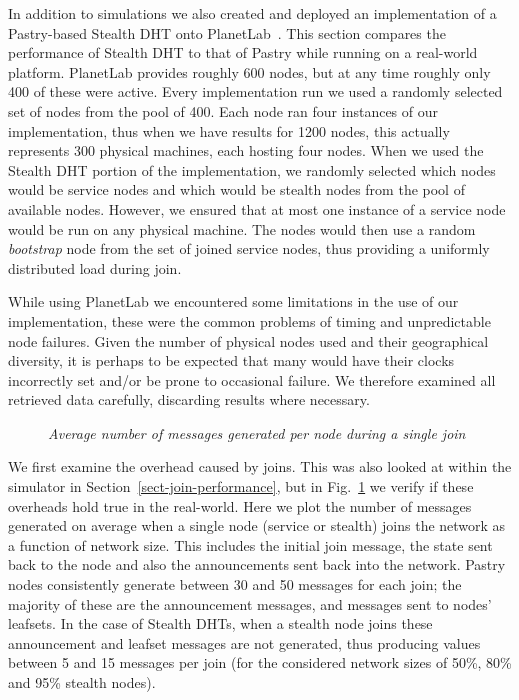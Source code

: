 \documentclass[letterpaper]{sig-alternate} %
\begin{document}
In addition to simulations we also created and deployed an
implementation of a Pastry-based Stealth DHT onto
PlanetLab~\cite{planetlab}. This section compares the performance of
Stealth DHT to that of Pastry while running on a real-world
platform. PlanetLab provides roughly 600 nodes, but at any time
roughly only 400 of these were active. Every implementation run we
used a randomly selected set of nodes from the pool of 400. Each
node ran four instances of our implementation, thus when we have
results for 1200 nodes, this actually represents 300 physical
machines, each hosting four nodes. When we used the Stealth DHT
portion of the implementation, we randomly selected which nodes
would be service nodes and which would be stealth nodes from the
pool of available nodes. However, we ensured that at most one
instance of a service node would be run on any physical machine. The
nodes would then use a random \emph{bootstrap} node from the set of
joined service nodes, thus providing a uniformly distributed load
during join.

While using PlanetLab we encountered some limitations in the use of
our implementation, these were the common problems of timing and
unpredictable node failures. Given the number of physical nodes used
and their geographical diversity, it is perhaps to be expected that
many would have their clocks incorrectly set and/or be prone to
occasional failure. We therefore examined all retrieved data
carefully, discarding results where necessary.

\begin{figure}[tb]
\centering
{}
\caption{\em Average number of messages generated per node during a single
join} \label{fig:imp_joinmsg}
\end{figure}

We first examine the overhead caused by joins. This was also looked
at within the simulator in Section~\ref{sect-join-performance}, but
in Fig.~\ref{fig:imp_joinmsg} we verify if these overheads hold true
in the real-world. Here we plot the number of messages generated on
average when a single node (service or stealth) joins the network as
a function of network size. This includes the initial join message,
the state sent back to the node and also the announcements sent back
into the network. Pastry nodes consistently generate between 30 and
50 messages for each join; the majority of these are the
announcement messages, and messages sent to nodes' leafsets. In the
case of Stealth DHTs, when a stealth node joins these announcement
and leafset messages are not generated, thus producing values
between 5 and 15 messages per join (for the considered network sizes
of 50\%, 80\% and 95\% stealth nodes).
\end{document}
